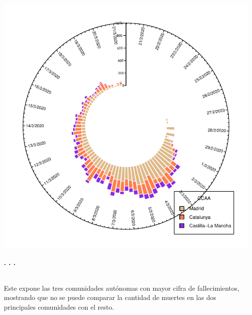 \documentclass{article}\usepackage[]{graphicx}\usepackage[]{color}
\makeatletter
\def\maxwidth{ %
  \ifdim\Gin@nat@width>\linewidth
    \linewidth
  \else
    \Gin@nat@width
  \fi
}
\newenvironment{knitrout}{}{} %
\makeatother
\begin{document}
\begin{knitrout}
\color{fgcolor}

{\centering \includegraphics[width=\maxwidth]{figure/circlize_col_sep-1} 

}



\end{knitrout}
\begin{center}
\textbf{. . .}
\end{center}
~\\
Este expone las tres comunidades aut\'onomas con mayor cifra de fallecimientos, mostrando que no se puede comparar la cantidad de muertes en las dos principales comunidades con el resto.
\end{document}
